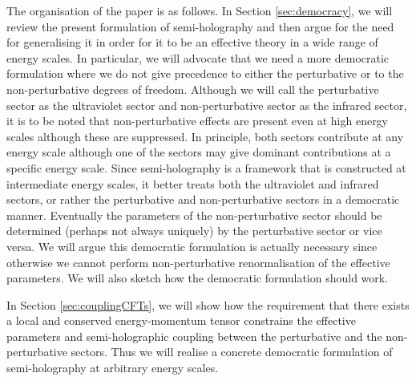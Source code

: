 \documentclass[prd,reprint,a4paper,showpacs,superscriptaddress,11pt,onecolumn,nofootinbib]{revtex4-1}
\renewcommand{\(}{\left(}
\renewcommand{\)}{\right)}
\newcommand{\6}{\partial}
\begin{document}
The organisation of the paper is as follows. In Section \ref{sec:democracy}, we will review the present formulation of semi-holography and then argue for the need for generalising it in order for it to be an effective theory in a wide range of energy scales. In particular, we will advocate that we need a more democratic formulation where we do not give precedence to either the perturbative or to the non-perturbative degrees of freedom. Although we will call the perturbative sector as the ultraviolet sector and non-perturbative sector as the infrared sector, it is to be noted that non-perturbative effects are present even at high energy scales although these are suppressed. In principle, both sectors contribute at any energy scale although one of the sectors may give dominant contributions at a specific energy scale. Since semi-holography is a framework that is constructed at intermediate energy scales, it better treats both the ultraviolet and infrared sectors, or rather the perturbative and non-perturbative sectors in a democratic manner. Eventually the parameters of the non-perturbative  sector should be determined (perhaps not always uniquely) by the perturbative sector or vice versa. We will argue this democratic formulation is actually necessary since otherwise we cannot perform non-perturbative renormalisation of the effective parameters. We will also sketch how the democratic formulation should work.

In Section \ref{sec:couplingCFTs}, we will show how the requirement that there exists a local and conserved energy-momentum tensor constrains the effective parameters and semi-holographic coupling between the perturbative and the non-perturbative sectors. Thus we will realise a concrete democratic formulation of semi-holography at arbitrary energy scales.
\end{document}
